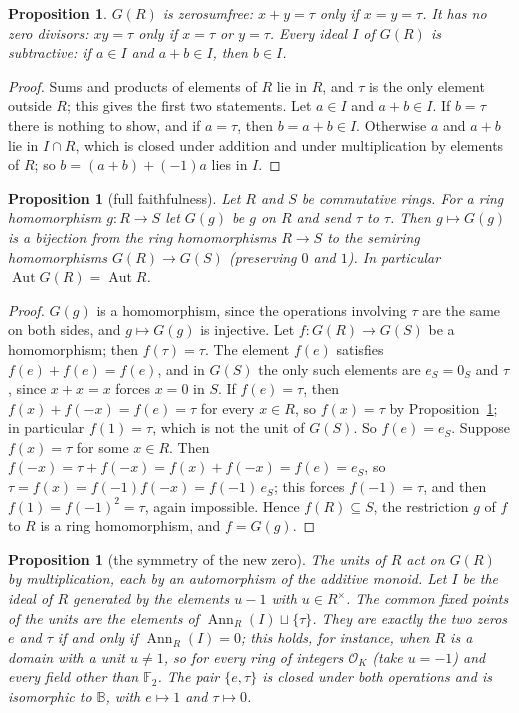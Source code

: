 \documentclass[11pt]{amsart}
\newtheorem{proposition}[thm]{Proposition}
\theoremstyle{remark}
\newcommand{\B}{\mathbb B}
\begin{document}
\begin{proposition}\label{prop:golan}
$G(R)$ is zerosumfree: $x+y=\tau$ only if $x=y=\tau$. It has no zero divisors: $xy=\tau$ only if $x=\tau$ or $y=\tau$. Every ideal $I$ of $G(R)$ is subtractive: if $a\in I$ and $a+b\in I$, then $b\in I$.
\end{proposition}

\begin{proof}
Sums and products of elements of $R$ lie in $R$, and $\tau$ is the only element outside $R$; this gives the first two statements. Let $a\in I$ and $a+b\in I$. If $b=\tau$ there is nothing to show, and if $a=\tau$, then $b=a+b\in I$. Otherwise $a$ and $a+b$ lie in $I\cap R$, which is closed under addition and under multiplication by elements of $R$; so $b=(a+b)+(-1)a$ lies in $I$.
\end{proof}

\begin{proposition}[full faithfulness]\label{prop:ff}
Let $R$ and $S$ be commutative rings. For a ring homomorphism $g\colon R\to S$ let $G(g)$ be $g$ on $R$ and send $\tau$ to $\tau$. Then $g\mapsto G(g)$ is a bijection from the ring homomorphisms $R\to S$ to the semiring homomorphisms $G(R)\to G(S)$ (preserving $0$ and $1$). In particular $\operatorname{Aut}G(R)=\operatorname{Aut}R$.
\end{proposition}

\begin{proof}
$G(g)$ is a homomorphism, since the operations involving $\tau$ are the same on both sides, and $g\mapsto G(g)$ is injective. Let $f\colon G(R)\to G(S)$ be a homomorphism; then $f(\tau)=\tau$. The element $f(e)$ satisfies $f(e)+f(e)=f(e)$, and in $G(S)$ the only such elements are $e_S=0_S$ and $\tau$, since $x+x=x$ forces $x=0$ in $S$. If $f(e)=\tau$, then $f(x)+f(-x)=f(e)=\tau$ for every $x\in R$, so $f(x)=\tau$ by Proposition~\ref{prop:golan}; in particular $f(1)=\tau$, which is not the unit of $G(S)$. So $f(e)=e_S$. Suppose $f(x)=\tau$ for some $x\in R$. Then $f(-x)=\tau+f(-x)=f(x)+f(-x)=f(e)=e_S$, so $\tau=f(x)=f(-1)f(-x)=f(-1)\,e_S$; this forces $f(-1)=\tau$, and then $f(1)=f(-1)^2=\tau$, again impossible. Hence $f(R)\subseteq S$, the restriction $g$ of $f$ to $R$ is a ring homomorphism, and $f=G(g)$.
\end{proof}

\begin{proposition}[the symmetry of the new zero]\label{prop:fix}
The units of $R$ act on $G(R)$ by multiplication, each by an automorphism of the additive monoid. Let $I$ be the ideal of $R$ generated by the elements $u-1$ with $u\in R^\times$. The common fixed points of the units are the elements of $\operatorname{Ann}_R(I)\sqcup\{\tau\}$. They are exactly the two zeros $e$ and $\tau$ if and only if $\operatorname{Ann}_R(I)=0$; this holds, for instance, when $R$ is a domain with a unit $u\neq1$, so for every ring of integers $\mathcal O_K$ (take $u=-1$) and every field other than $\mathbb F_2$. The pair $\{e,\tau\}$ is closed under both operations and is isomorphic to $\B$, with $e\mapsto1$ and $\tau\mapsto0$.
\end{proposition}
\end{document}
